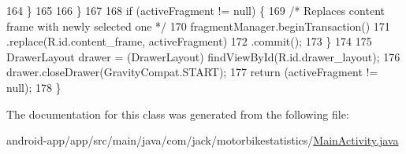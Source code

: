 \begin{DoxyCode}
164             \}
165 
166         \}
167 
168         \textcolor{keywordflow}{if} (activeFragment != null) \{
169             \textcolor{comment}{/* Replaces content frame with newly selected one */}
170             fragmentManager.beginTransaction()
171                     .replace(R.id.content\_frame, activeFragment)
172                     .commit();
173         \}
174 
175         DrawerLayout drawer = (DrawerLayout) findViewById(R.id.drawer\_layout);
176         drawer.closeDrawer(GravityCompat.START);
177         \textcolor{keywordflow}{return} (activeFragment != null);
178     \}
\end{DoxyCode}


The documentation for this class was generated from the following file\+:\begin{DoxyCompactItemize}
\item 
android-\/app/app/src/main/java/com/jack/motorbikestatistics/\hyperlink{_main_activity_8java}{Main\+Activity.\+java}\end{DoxyCompactItemize}
